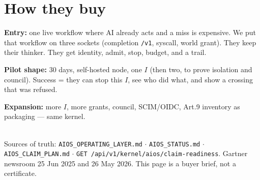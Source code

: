\documentclass[10pt]{article}
\newcommand{\muted}[1]{\textcolor{textmuted}{#1}}
\begin{document}
\section{How they buy}

\textbf{Entry:} one live workflow where AI already acts and a miss is expensive. We put that workflow on three sockets (completion \texttt{/v1}, syscall, world grant). They keep their thinker. They get identity, admit, stop, budget, and a trail.

\textbf{Pilot shape:} 30 days, self-hosted node, one $I$ (then two, to prove isolation and council). Success = they can stop this $I$, see who did what, and show a crossing that was refused.

\textbf{Expansion:} more $I$, more grants, council, SCIM/OIDC, Art.9 inventory as packaging --- same kernel.

\vspace{0.45em}
\noindent{\color{rule}\rule{\linewidth}{0.5pt}}\\[0.35em]
{\footnotesize\muted{Sources of truth: \texttt{AIOS\_OPERATING\_LAYER.md} $\cdot$ \texttt{AIOS\_STATUS.md} $\cdot$ \texttt{AIOS\_CLAIM\_PLAN.md} $\cdot$ \texttt{GET /api/v1/kernel/aios/claim-readiness}. Gartner newsroom 25 Jun 2025 and 26 May 2026. This page is a buyer brief, not a certificate.}}
\end{document}
